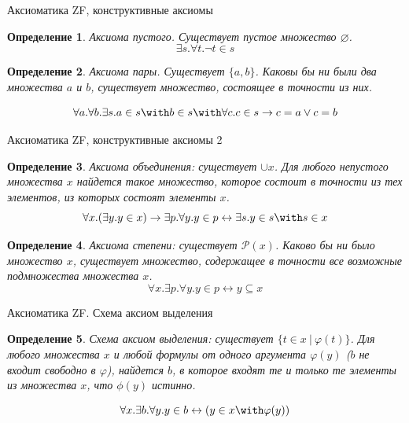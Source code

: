 \documentclass[aspectratio=169]{beamer}
\newtheorem{dfn}{Определение}[section]
\begin{document}
\begin{frame}{Аксиоматика ZF, конструктивные аксиомы}
\begin{dfn} Аксиома пустого. Существует пустое множество $\varnothing$. $$\exists s.\forall t.\neg t \in s$$ \end{dfn}\pause
\begin{dfn} Аксиома пары. Существует $\{a,b\}$.
Каковы бы ни были два множества $a$ и $b$, существует множество, состоящее 
в точности из них. 

$$\forall a.\forall b.\exists s.a \in s \with b \in s \with \forall c.c \in s \rightarrow c = a \vee c = b$$ \end{dfn}
\end{frame}

\begin{frame}{Аксиоматика ZF, конструктивные аксиомы 2}
\begin{dfn} Аксиома объединения: существует $\cup x$. 
Для любого непустого множества $x$ найдется такое множество, которое состоит в точности
из тех элементов, из которых состоят элементы $x$. 
$$\forall x.(\exists y.y \in x) \rightarrow \exists p.\forall y.y \in p \leftrightarrow \exists s.y \in s \with s \in x$$
 \end{dfn}\pause
\begin{dfn} Аксиома степени: существует $\mathcal{P}(x)$.
Каково бы ни было множество $x$, существует множество, содержащее в точности
все возможные подмножества множества $x$.
$$\forall x.\exists p.\forall y.y \in p \leftrightarrow y \subseteq x$$
\end{dfn}
\end{frame}

\begin{frame}{Аксиоматика ZF. Схема аксиом выделения}
\begin{dfn} Схема аксиом выделения: существует $\{ t \in x\ |\ \varphi(t)\}$.
Для любого множества $x$ и любой формулы от одного аргумента $\varphi(y)$
($b$ не входит свободно в $\varphi$), найдется $b$, в которое
входят те и только те элементы из множества $x$, что $\phi(y)$ истинно.

$$\forall x.\exists b.\forall y.y \in b \leftrightarrow (y \in x \with \varphi(y))$$
\end{dfn}
\end{frame}
\end{document}
